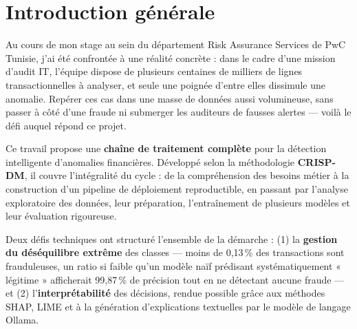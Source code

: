 \documentclass[12pt,a4paper,twoside]{report}
\begin{document}
\newpage


\chapter*{Introduction générale}

Au cours de mon stage au sein du département Risk Assurance Services de PwC Tunisie, j'ai été confrontée à une réalité concrète : dans le cadre d'une mission d'audit IT, l'équipe dispose de plusieurs centaines de milliers de lignes transactionnelles à analyser, et seule une poignée d'entre elles dissimule une anomalie. Repérer ces cas dans une masse de données aussi volumineuse, sans passer à côté d'une fraude ni submerger les auditeurs de fausses alertes --- voilà le défi auquel répond ce projet.

Ce travail propose une \textbf{chaîne de traitement complète} pour la détection intelligente d'anomalies financières. Développé selon la méthodologie \textbf{CRISP-DM}, il couvre l'intégralité du cycle : de la compréhension des besoins métier à la construction d'un pipeline de déploiement reproductible, en passant par l'analyse exploratoire des données, leur préparation, l'entraînement de plusieurs modèles et leur évaluation rigoureuse.

Deux défis techniques ont structuré l'ensemble de la démarche : (1) la \textbf{gestion du déséquilibre extrême} des classes --- moins de 0,13\,\% des transactions sont frauduleuses, un ratio si faible qu'un modèle naïf prédisant systématiquement « légitime » afficherait 99,87\,\% de précision tout en ne détectant aucune fraude --- et (2) l'\textbf{interprétabilité} des décisions, rendue possible grâce aux méthodes SHAP, LIME et à la génération d'explications textuelles par le modèle de langage Ollama.
\end{document}
